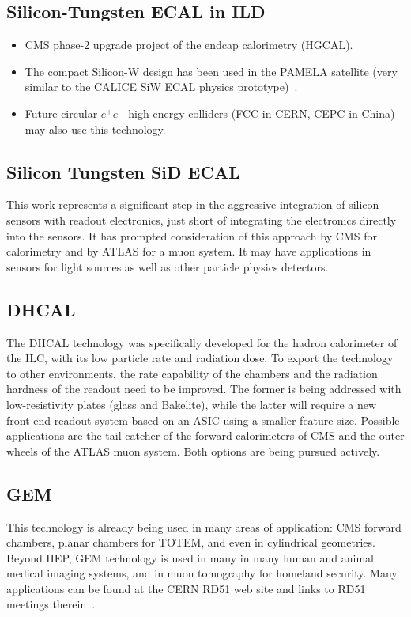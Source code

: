 \subsection{Silicon-Tungsten ECAL in ILD}
\begin{itemize}
\item CMS phase-2 upgrade project of the
 endcap calorimetry (HGCAL).
\item The compact Silicon-W design has been used in the PAMELA satellite (very
 similar to the CALICE SiW ECAL physics prototype)~\cite{1742-6596-160-1-012039}.
\item Future circular $e^+e^-$ high energy colliders (FCC in CERN, CEPC in China)
may also use this technology.
\end{itemize}

\subsection{Silicon Tungsten SiD ECAL}
This work represents a significant step in the aggressive integration of silicon sensors with readout electronics, just short of integrating the electronics directly into the sensors. It has prompted consideration of this approach by CMS for calorimetry and by ATLAS for a muon system.  It may have applications in sensors for light sources as well as other particle physics detectors.

\subsection{DHCAL}
The DHCAL technology was specifically developed for the hadron calorimeter of the ILC, with its low particle rate and radiation dose. To export the technology to other environments, the rate capability of the chambers and the radiation hardness of the readout need to be improved. The former is being addressed with low-resistivity plates (glass and Bakelite), while the latter will require a new front-end readout system based on an ASIC using a smaller feature size. Possible applications are the tail catcher of the forward calorimeters of CMS and the outer wheels of the ATLAS muon system. Both options are being pursued actively.

\subsection{GEM}
This technology is already being used in many areas of application: CMS forward chambers, planar chambers for TOTEM, and even in cylindrical geometries. Beyond HEP, GEM technology is used in many in many human and animal medical imaging systems, and in muon tomography for homeland security. Many applications can be found at the CERN RD51 web site and links to RD51 meetings therein~\cite{RD51Collaboration}.

